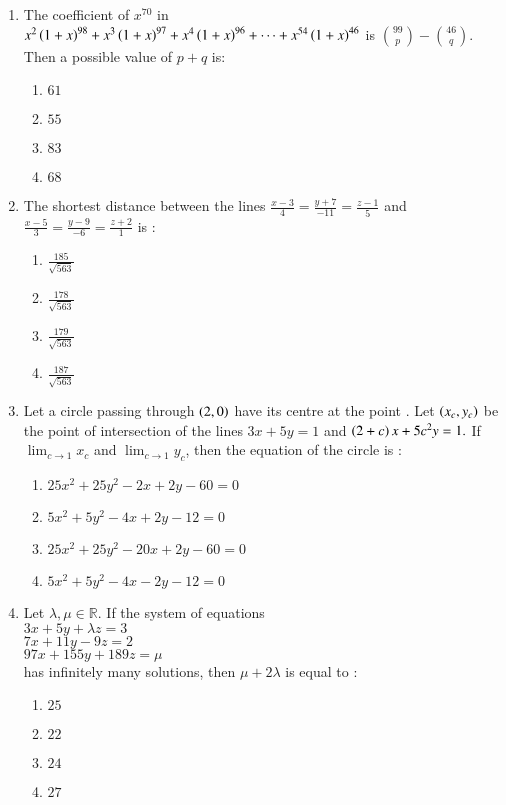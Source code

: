 \documentclass[journal,12pt,onecolumn]{IEEEtran}
\theoremstyle{remark}
\begin{document}
\begin{enumerate}
\item The coefficient of $x^{70}$ in $x^2\left(1+x\right)^{98}+x^3\left(1+x\right)^{97}+x^4\left(1+x\right)^{96}+\cdots+x^{54}\left(1+x\right)^{46}$ is $\binom{99}{p}-\binom{46}{q}$. Then a possible value of $p + q$ is:
     \begin{enumerate}
     \item $61$ \item $55$ \item $83$ \item $68$
     \end{enumerate}
\item The shortest distance between the lines $\frac{x-3}{4}=\frac{y+7}{-11}=\frac{z-1}{5}$ and $\frac{x-5}{3}=\frac{y-9}{-6}=\frac{z+2}{1}$ is :
     \begin{enumerate}
     \item $\frac{185}{\sqrt{563}}$ 
     \item $\frac{178}{\sqrt{563}}$
     \item $\frac{179}{\sqrt{563}}$
     \item $\frac{187}{\sqrt{563}}$
     \end{enumerate}
\item Let a circle passing through $\left(2,0\right)$ have its centre at the point . Let $\left(x_c,y_c\right)$ be the point of intersection of the lines $3x+5y=1$ and $\left(2+c\right)x+5c^2y=1.$ If $\displaystyle \lim_{c \to 1}x_c$ and $\displaystyle \lim_{c \to 1}y_c$, then the equation of the circle is :
     \begin{enumerate}
     \item $25x^2+25y^2-2x+2y-60=0$
     \item $5x^2+5y^2-4x+2y-12=0$
     \item $25x^2+25y^2-20x+2y-60=0$
     \item $5x^2+5y^2-4x-2y-12=0$
     \end{enumerate}
\item Let $\lambda,\mu \in \mathbb{R}.$ If the system of equations\\
	$3x+5y+\lambda z=3$\\
	$7x+11y-9z=2$\\
	$97x+155y+189z=\mu $\\
	has infinitely many solutions, then $\mu +2\lambda$ is equal to :
     \begin{enumerate}
     \item $25$ \item $22$ \item $24$ \item $27$

\end{enumerate}
\end{enumerate}
\end{document}

